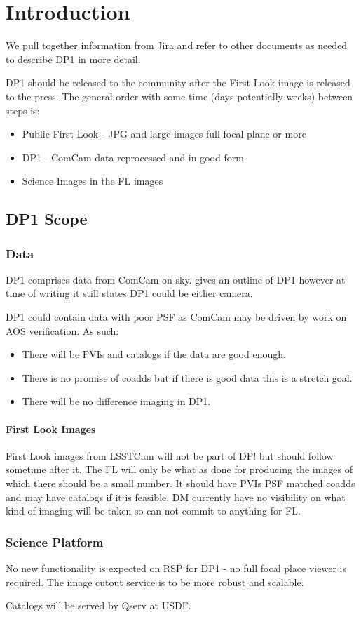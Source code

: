 \section{Introduction} \label{sec:intro}

We pull together information from Jira and refer to other documents as needed to describe DP1 in more detail.

DP1 should be released to the community after the First Look image is released to the press.
The general order with some time (days potentially weeks)  between steps is:

\begin{itemize}
\item Public First Look - JPG and large images full focal plane or more
\item DP1 - ComCam data reprocessed and in good form
\item Science Images in the FL images
\end{itemize}


\subsection{DP1 Scope} \label{sec:scope}
\subsubsection{Data}
DP1 comprises data from ComCam on sky.
 gives an outline of DP1 however at time of writing it still states DP1 could be either camera.

DP1 could contain data with poor PSF as ComCam may be driven by work on AOS verification.
As such:
\begin{itemize}
\item There will be PVIs and catalogs if the data are good enough.
\item There is no promise of coadds but if there is good data this is a stretch goal.
\item There will be no difference imaging in DP1.
\end{itemize}

\paragraph{First Look Images} \label{sec:fl}

First Look images from LSSTCam will not be part of DP! but should follow sometime after it.
The FL will only be what as done for producing the images of which there should be a small number.
It should have PVIs PSF matched coadds  and  may have catalogs if it is feasible.
DM currently have no visibility on what kind of imaging will be taken so can not commit to anything for FL.

\subsubsection{Science Platform}
No new functionality is expected on RSP for DP1 - no full focal place viewer is required.
The image cutout service is to be more robust and scalable.


Catalogs will be served by Qserv at USDF.





